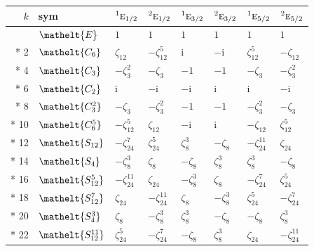 \documentclass[10pt,a4paper]{article}
\numberwithin{equation}{section}
\newcommand{\eltfont}[1]{{\let\sigma\eltsigma\mathelt{#1}}}
\newcommand{\irr}[1]{\text{\normalfont\scshape #1}}
\newcommand{\conjpair}[1]{{}^{#1}}
\newcommand{\cls}[1]{\eltfont{#1}}
\newcommand{\iunit}{\mathrm{i}}
\newcommand{\rootunity}[1]{\zeta_{#1}}
\begin{document}
{\small\setlength{\tabcolsep}{4pt}
\begin{longtable}{@{}rlllllll@{}}\toprule
$k$ & sym & $\conjpair{1}\irr{e}_{1/2}$ & $\conjpair{2}\irr{e}_{1/2}$ & $\conjpair{1}\irr{e}_{3/2}$ & $\conjpair{2}\irr{e}_{3/2}$ & $\conjpair{1}\irr{e}_{5/2}$ & $\conjpair{2}\irr{e}_{5/2}$\\\midrule\endhead
\bottomrule\endfoot\endlastfoot
0 & $\cls{E}$ & $1$ & $1$ & $1$ & $1$ & $1$ & $1$\\*
2 & $\cls{C_{6}}$ & $\rootunity{12}$ & $-\rootunity{12}^{5}$ & $\iunit{}$ & $-\iunit{}$ & $\rootunity{12}^{5}$ & $-\rootunity{12}$\\*
4 & $\cls{C_{3}}$ & $-\rootunity{3}^{2}$ & $-\rootunity{3}$ & $-1$ & $-1$ & $-\rootunity{3}$ & $-\rootunity{3}^{2}$\\*
6 & $\cls{C_{2}}$ & $\iunit{}$ & $-\iunit{}$ & $-\iunit{}$ & $\iunit{}$ & $\iunit{}$ & $-\iunit{}$\\*
8 & $\cls{C_{3}^{2}}$ & $-\rootunity{3}$ & $-\rootunity{3}^{2}$ & $-1$ & $-1$ & $-\rootunity{3}^{2}$ & $-\rootunity{3}$\\*
10 & $\cls{C_{6}^{5}}$ & $-\rootunity{12}^{5}$ & $\rootunity{12}$ & $-\iunit{}$ & $\iunit{}$ & $-\rootunity{12}$ & $\rootunity{12}^{5}$\\*
12 & $\cls{S_{12}}$ & $-\rootunity{24}^{7}$ & $\rootunity{24}^{5}$ & $\rootunity{8}^{3}$ & $-\rootunity{8}$ & $-\rootunity{24}^{11}$ & $\rootunity{24}$\\*
14 & $\cls{S_{4}}$ & $-\rootunity{8}^{3}$ & $\rootunity{8}$ & $-\rootunity{8}$ & $\rootunity{8}^{3}$ & $\rootunity{8}^{3}$ & $-\rootunity{8}$\\*
16 & $\cls{S_{12}^{5}}$ & $-\rootunity{24}^{11}$ & $\rootunity{24}$ & $-\rootunity{8}^{3}$ & $\rootunity{8}$ & $-\rootunity{24}^{7}$ & $\rootunity{24}^{5}$\\*
18 & $\cls{S_{12}^{7}}$ & $\rootunity{24}$ & $-\rootunity{24}^{11}$ & $\rootunity{8}$ & $-\rootunity{8}^{3}$ & $\rootunity{24}^{5}$ & $-\rootunity{24}^{7}$\\*
20 & $\cls{S_{4}^{3}}$ & $\rootunity{8}$ & $-\rootunity{8}^{3}$ & $\rootunity{8}^{3}$ & $-\rootunity{8}$ & $-\rootunity{8}$ & $\rootunity{8}^{3}$\\*
22 & $\cls{S_{12}^{11}}$ & $\rootunity{24}^{5}$ & $-\rootunity{24}^{7}$ & $-\rootunity{8}$ & $\rootunity{8}^{3}$ & $\rootunity{24}$ & $-\rootunity{24}^{11}$\\
\bottomrule\end{longtable}}
\end{document}
